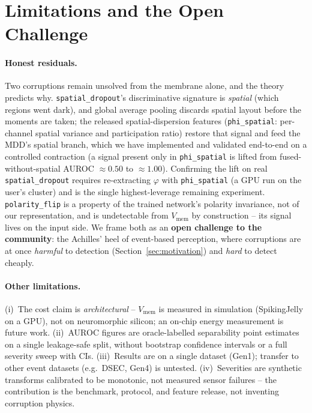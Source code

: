 \section{Limitations and the Open Challenge}
\label{sec:limitations}

\paragraph{Honest residuals.}
Two corruptions remain unsolved from the membrane alone, and the theory predicts why.
\texttt{spatial\_dropout}'s discriminative signature is \emph{spatial} (which regions went
dark), and global average pooling discards spatial layout before the moments are taken; the
released spatial-dispersion features (\texttt{phi\_spatial}: per-channel spatial variance and
participation ratio) restore that signal and feed the MDD's spatial branch, which we have
implemented and validated end-to-end on a controlled contraction (a signal present only in
\texttt{phi\_spatial} is lifted from fused-without-spatial AUROC $\approx 0.50$ to
$\approx 1.00$). Confirming the lift on real \texttt{spatial\_dropout} requires re-extracting
$\varphi$ with \texttt{phi\_spatial} (a GPU run on the user's cluster) and is the single
highest-leverage remaining experiment. \texttt{polarity\_flip} is a property of the trained
network's polarity invariance, not of our representation, and is undetectable from
$V_{\mathrm{mem}}$ by construction -- its signal lives on the input side. We frame both as an
\textbf{open challenge to the community}: the Achilles' heel of event-based perception, where
corruptions are at once \emph{harmful} to detection (Section~\ref{sec:motivation}) and
\emph{hard} to detect cheaply.

\paragraph{Other limitations.}
(i)~The cost claim is \emph{architectural} -- $V_{\mathrm{mem}}$ is measured in simulation
(SpikingJelly on a GPU), not on neuromorphic silicon; an on-chip energy measurement is future
work. (ii)~AUROC figures are oracle-labelled separability point estimates on a single
leakage-safe split, without bootstrap confidence intervals or a full severity sweep with CIs.
(iii)~Results are on a single dataset (Gen1); transfer to other event datasets (e.g.\ DSEC,
Gen4) is untested. (iv)~Severities are synthetic transforms calibrated to be monotonic, not
measured sensor failures -- the contribution is the benchmark, protocol, and feature release,
not inventing corruption physics.

